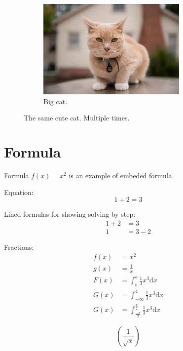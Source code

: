 \documentclass[times, utf8, diplomski]{fer}
\begin{document}
\begin{figure}[ht!]
  \begin{subfigure}[b]{0.5\linewidth}
    \includegraphics[width=\linewidth]{images/cat.jpg}
    \caption{Big cat.}
  \end{subfigure}

  \caption{The same cute cat. Multiple times.}
  \label{fig:multiple_cats}
\end{figure}

\chapter{Formula}
Formula $f(x) = x^2$ is an example of embeded formula.

Equation:
\begin{equation*}
  1 + 2 = 3
\end{equation*}

Lined formulas for showing solving by step:
\begin{align*}
  1 + 2 &= 3\\
  1 &= 3 - 2
\end{align*}

Fractions:
\begin{align*}
  f(x) &= x^2\\
  g(x) &= \frac{1}{x}\\
  F(x) &= \int^a_b \frac{1}{3}x^3 \mathrm{d}x\\
  G(x) &= \int^4_{-\infty} \frac{1}{3}x^3 \mathrm{d}x\\
  G(x) &= \int^{\frac{\pi}{2}}_{\frac{-\pi}{2}} \frac{1}{3}x^3 \mathrm{d}x
\end{align*}

\begin{equation*}
  \left(
    \frac{1}{\sqrt{x}}
  \right)
\end{equation*}
\end{document}
